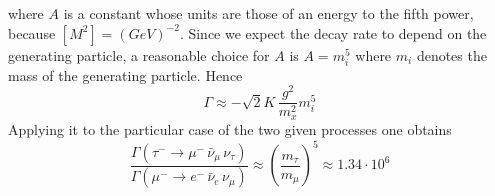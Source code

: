 where $A$ is a constant whose units are those of an energy to the fifth power, because $[M^2] = (GeV)^{-2}$. Since we expect the decay rate 
to depend on the generating particle, a reasonable choice for $A$ is $A=m_i^5$ where $m_i$ denotes the mass of the generating particle. Hence
\begin{equation*}
    \Gamma \approx - \sqrt{2} K \, \frac{g^2}{m_x^2}m_i^5
\end{equation*}
Applying it to the particular case of the two given processes one obtains
\begin{equation*}
    \frac{\Gamma\left(\tau^- \rightarrow \mu^- \, \bar\nu_{\mu} \, \nu_{\tau}\right)}{\Gamma\left( \mu^- \rightarrow e^- \, \bar\nu_e \, \nu_{\mu}\right)}
    \approx \left(\frac{m_{\tau}}{m_{\mu}}\right)^5 \approx 1.34 \cdot 10^6
\end{equation*}